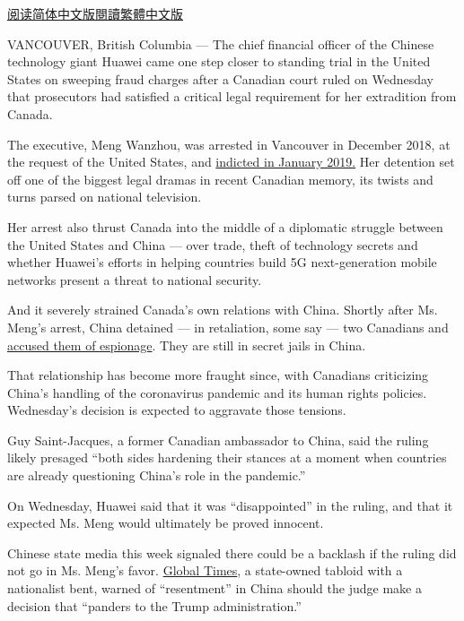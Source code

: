 \href{https://cn.nytimes3xbfgragh.onion/world/20200528/huawei-extradition-meng-wanzhou/}{阅读简体中文版}\href{https://cn.nytimes3xbfgragh.onion/world/20200528/huawei-extradition-meng-wanzhou/zh-hant/}{閱讀繁體中文版}

VANCOUVER, British Columbia --- The chief financial officer of the
Chinese technology giant Huawei came one step closer to standing trial
in the United States on sweeping fraud charges after a Canadian court
ruled on Wednesday that prosecutors had satisfied a critical legal
requirement for her extradition from Canada.

The executive, Meng Wanzhou, was arrested in Vancouver in December 2018,
at the request of the United States, and
\href{https://www.nytimes3xbfgragh.onion/2019/01/28/us/politics/meng-wanzhou-huawei-iran.html}{indicted
in January 2019.} Her detention set off one of the biggest legal dramas
in recent Canadian memory, its twists and turns parsed on national
television.

Her arrest also thrust Canada into the middle of a diplomatic struggle
between the United States and China --- over trade, theft of technology
secrets and whether Huawei's efforts in helping countries build 5G
next-generation mobile networks present a threat to national security.

And it severely strained Canada's own relations with China. Shortly
after Ms. Meng's arrest, China detained --- in retaliation, some say ---
two Canadians and
\href{https://www.nytimes3xbfgragh.onion/2019/03/04/world/asia/china-canada-michael-kovrig-huawei.html?module=inline}{accused
them of espionage}. They are still in secret jails in China.

That relationship has become more fraught since, with Canadians
criticizing China's handling of the coronavirus pandemic and its human
rights policies. Wednesday's decision is expected to aggravate those
tensions.

Guy Saint-Jacques, a former Canadian ambassador to China, said the
ruling likely presaged ``both sides hardening their stances at a moment
when countries are already questioning China's role in the pandemic.''

On Wednesday, Huawei said that it was ``disappointed'' in the ruling,
and that it expected Ms. Meng would ultimately be proved innocent.

Chinese state media this week signaled there could be a backlash if the
ruling did not go in Ms. Meng's favor.
\href{https://www.globaltimes.cn/content/1189476.shtml}{Global Times}, a
state-owned tabloid with a nationalist bent, warned of ``resentment'' in
China should the judge make a decision that ``panders to the Trump
administration.''

